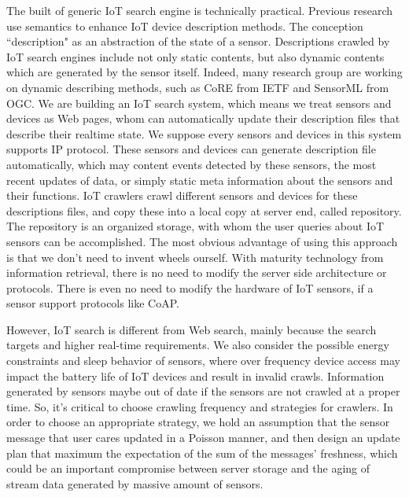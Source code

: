 \documentclass[conference]{IEEEtran}
\begin{document}
The built of generic IoT search engine is technically practical. Previous research use semantics\cite{Pfisterer2011} to enhance IoT device description methods. The conception ``description" as an abstraction of the state of a sensor.
Descriptions crawled by IoT search engines include not only static contents, but also dynamic contents which are generated by the sensor itself. Indeed, many research group are working on dynamic describing methods, such as CoRE\cite{CoREWorkingGroup2012} from IETF and SensorML\cite{botts2007opengis} from OGC. 
We are building an IoT search system, which means we treat sensors and devices as Web pages, whom can automatically update their description files that describe their realtime state.
We suppose every sensors and devices in this system supports IP protocol. These sensors and devices can generate description file automatically, which may content events detected by these sensors, the most recent updates of data, or simply static meta information about the sensors and their functions. 
IoT crawlers crawl different sensors and devices for these descriptions files, and copy these into a local copy at server end, called repository. The repository is an organized storage, with whom the user queries about IoT sensors can be accomplished.
The most obvious advantage of using this approach is that we don't need to invent wheels ourself. With maturity technology from information retrieval, there is no need to modify the server side architecture or protocols. There is even no need to modify the hardware of IoT sensors, if a sensor support protocols like CoAP.


However, IoT search is different from Web search, mainly because the search targets and higher real-time requirements. We also consider the possible energy constraints and sleep behavior of sensors, where over frequency device access may impact the battery life of IoT devices and result in invalid crawls. Information generated by sensors maybe out of date if the sensors are not crawled at a proper time. So, it's critical to choose crawling frequency and strategies for crawlers. 
In order to choose an appropriate strategy, we hold an assumption that the sensor message that user cares updated in a Poisson manner, and then design an update plan that maximum the expectation of the sum of the messages' freshness, which could be an important compromise between server storage and the aging of stream data generated by massive amount of sensors.
\end{document}
